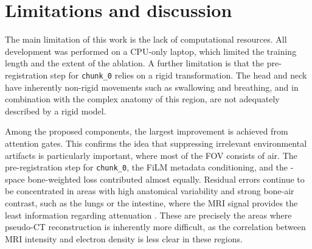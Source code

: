 \documentclass{article}
\begin{document}
\section{Limitations and discussion}

The main limitation of this work is the lack of computational resources. All development was performed on a CPU-only laptop, which limited the training length and the extent of the ablation.
A further limitation is that the pre-registration step for \texttt{chunk\_0} relies on a rigid transformation. The head and neck have inherently non-rigid movements such as swallowing and breathing, and in combination with the complex anatomy of this region, are not adequately described by a rigid model\cite{monti2017evaluation}.

Among the proposed components, the largest improvement is achieved from attention gates. This confirms the idea that suppressing irrelevant environmental artifacts is particularly important, where most of the FOV consists of air. 
The pre-registration step for \texttt{chunk\_0}, the FiLM metadata conditioning, and the \textmu-space bone-weighted loss contributed almost equally. 
Residual errors continue to be concentrated in areas with high anatomical variability and strong bone-air contrast, such as the lungs or the intestine, where the MRI signal provides the least information regarding attenuation \cite{dayarathna2024deep}. 
These are precisely the areas where pseudo-CT reconstruction is inherently more difficult, as the correlation between MRI intensity and electron density is less clear in these regions.



  

\end{document}
